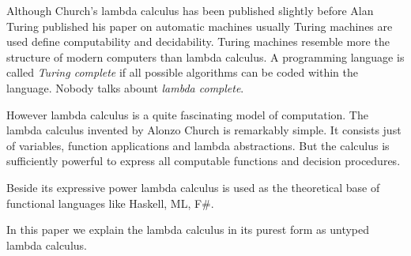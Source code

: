 Although Church's lambda calculus has been published slightly before Alan
Turing published his paper on automatic machines usually Turing machines are
used define computability and decidability. Turing machines resemble more the
structure of modern computers than lambda calculus. A programming language is
called \emph{Turing complete} if all possible algorithms can be coded within
the language. Nobody talks abount \emph{lambda complete}.

However lambda calculus is a quite fascinating model of computation.  The
lambda calculus invented by Alonzo Church is remarkably simple. It consists
just of variables, function applications and lambda abstractions. But the
calculus is sufficiently powerful to express all computable functions and
decision procedures.

Beside its expressive power lambda calculus is used as the theoretical base of
functional languages like Haskell, ML, F\#.

In this paper we explain the lambda calculus in its purest form as untyped
lambda calculus.
